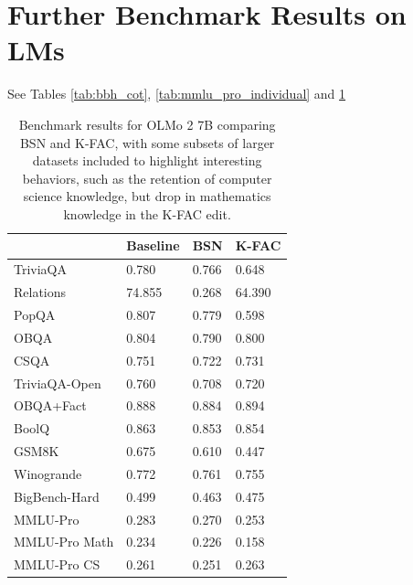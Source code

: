 \documentclass{article} %
\begin{document}
\section{Further Benchmark Results on LMs}
\label{sec:more_lm_benchmarks}
See Tables \ref{tab:bbh_cot}, \ref{tab:mmlu_pro_individual} and \ref{tab:extra_metrics_7b}
\begin{table}[]
\centering
\begin{tabular}{l|l|l|l}
              & Baseline & BSN   & K-FAC  \\ \hline
TriviaQA      & 0.780    & 0.766 & 0.648  \\
Relations     & 74.855   & 0.268 & 64.390 \\
PopQA         & 0.807    & 0.779 & 0.598  \\
OBQA          & 0.804    & 0.790 & 0.800  \\
CSQA          & 0.751    & 0.722 & 0.731  \\ \hline
TriviaQA-Open & 0.760    & 0.708 & 0.720  \\
OBQA+Fact     & 0.888    & 0.884 & 0.894  \\
BoolQ         & 0.863    & 0.853 & 0.854  \\ \hline
GSM8K         & 0.675    & 0.610 & 0.447  \\
Winogrande    & 0.772    & 0.761 & 0.755  \\ \hline
BigBench-Hard & 0.499    & 0.463 & 0.475  \\
MMLU-Pro      & 0.283    & 0.270 & 0.253  \\ \hline
MMLU-Pro Math & 0.234    & 0.226 & 0.158  \\
MMLU-Pro CS   & 0.261    & 0.251 & 0.263 
\end{tabular}
\caption{Benchmark results for OLMo 2 7B comparing BSN and K-FAC, with some subsets of larger datasets included to highlight interesting behaviors, such as the retention of computer science knowledge, but drop in mathematics knowledge in the K-FAC edit.}
\label{tab:extra_metrics_7b}
\end{table}
\end{document}
